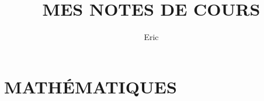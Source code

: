 \documentclass[openany]{book}
\begin{document}
\title{MES NOTES DE COURS}
\author{Eric}
\maketitle
\tableofcontents
\frontmatter

\part{MATH\'EMATIQUES}





\end{document}
